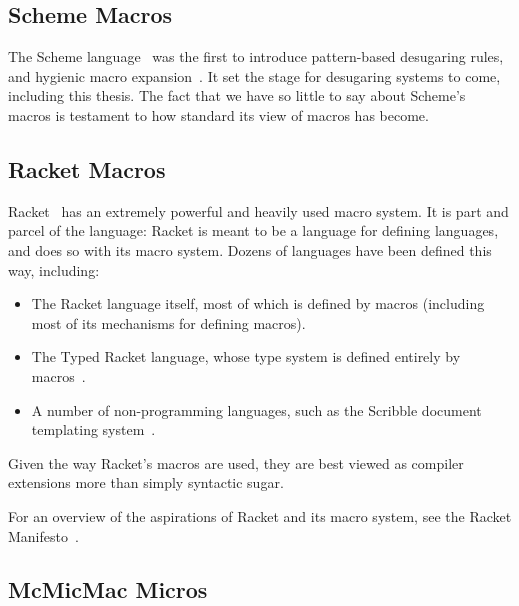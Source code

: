 \subsection{Scheme Macros}

The Scheme language~\cite{scheme5} was the first to introduce pattern-based
desugaring rules, and hygienic macro expansion~\cite{hygienic-macros}. It set
the stage for desugaring systems to come, including this thesis. The
fact that we have so little to say about Scheme's macros is testament
to how standard its view of macros has become.

\subsection{Racket Macros}

Racket~\cite{plt-tr1} has an extremely powerful and heavily used macro
system. It is part and parcel of the language: Racket is meant to be a
language for defining languages, and does so with its macro system.
Dozens of languages have been defined this way, including:
\begin{itemize}
\item The Racket language itself, most of which is defined by macros
  (including most of its mechanisms for defining macros).
\item The Typed Racket language, whose type system is defined entirely
  by macros~\cite{typed-racket}.
\item A number of non-programming languages, such as the Scribble
  document templating system~\cite{scribble}.
\end{itemize}
Given the way Racket's macros are used, they are best viewed as
compiler extensions more than simply syntactic sugar.

For an overview of the aspirations of Racket and its macro system, see
the Racket Manifesto~\cite{racket-manifesto}.


\subsection{McMicMac Micros} \label{sec:taxonomy-mcmicmac}


